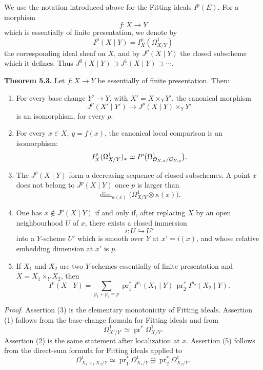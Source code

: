 \documentclass[11pt]{article}
\providecommand{\pr}{\operatorname{pr}}
\begin{document}
We use the notation introduced above for the Fitting ideals \(I^p(E)\).  For a morphism
\[
        f:X\longrightarrow Y
\]
which is essentially of finite presentation, we denote by
\[
        I^p(X\mid Y)=I^p_X(\Omega^1_{X/Y})
\]
the corresponding ideal sheaf on \(X\), and by \(J^p(X\mid Y)\) the closed subscheme which it defines.  Thus \(J^0(X\mid Y)\supset J^1(X\mid Y)\supset\cdots\).

\textbf{Theorem 5.3.}  Let \(f:X\to Y\) be essentially of finite presentation.  Then:
\begin{enumerate}[label=(\arabic*)]
\item For every base change \(Y'\to Y\), with \(X'=X\times_Y Y'\), the canonical morphism
\[
        J^p(X'\mid Y')\longrightarrow J^p(X\mid Y)\times_Y Y'
\]
is an isomorphism, for every \(p\).
\item For every \(x\in X\), \(y=f(x)\), the canonical local comparison is an isomorphism:
\[
        I^p_X(\Omega^1_{X/Y})_x
        \simeq
        I^p\bigl(\Omega^1_{\mathcal O_{X,x}/\mathcal O_{Y,y}}\bigr).
\]
\item The \(J^p(X\mid Y)\) form a decreasing sequence of closed subschemes.  A point \(x\) does not belong to \(J^p(X\mid Y)\) once \(p\) is larger than
\[
        \dim_{\kappa(x)}\bigl(\Omega^1_{X/Y}\otimes\kappa(x)\bigr).
\]
\item One has \(x\notin J^p(X\mid Y)\) if and only if, after replacing \(X\) by an open neighbourhood \(U\) of \(x\), there exists a closed immersion
\[
        i:U\hookrightarrow U'
\]
into a \(Y\)-scheme \(U'\) which is smooth over \(Y\) at \(x'=i(x)\), and whose relative embedding dimension at \(x'\) is \(p\).
\item If \(X_1\) and \(X_2\) are two \(Y\)-schemes essentially of finite presentation and \(X=X_1\times_YX_2\), then
\[
        I^p(X\mid Y)
        =
        \sum_{p_1+p_2=p}
        \pr_1^*I^{p_1}(X_1\mid Y)\,
        \pr_2^*I^{p_2}(X_2\mid Y).
\]
\end{enumerate}

\emph{Proof.}  Assertion (3) is the elementary monotonicity of Fitting ideals.  Assertion (1) follows from the base-change formula for Fitting ideals and from
\[
        \Omega^1_{X'/Y'}\simeq \pr^*\Omega^1_{X/Y}.
\]
Assertion (2) is the same statement after localization at \(x\).  Assertion (5) follows from the direct-sum formula for Fitting ideals applied to
\[
        \Omega^1_{X_1\times_YX_2/Y}
        \simeq
        \pr_1^*\Omega^1_{X_1/Y}\oplus
        \pr_2^*\Omega^1_{X_2/Y}.
\]
\end{document}

